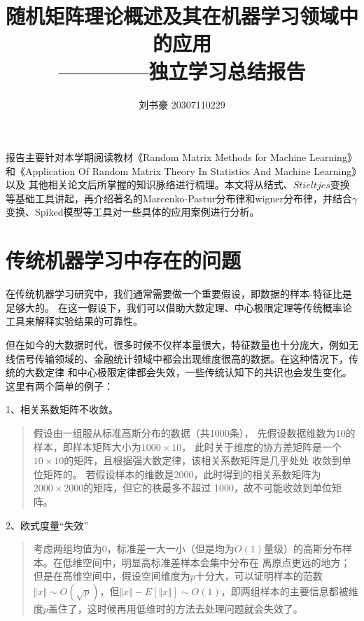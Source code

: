 \documentclass[UTF8,12pt]{ctexart}
\newenvironment{myquote}
{\begin{quote}\kaishu\zihao{5}}
{\end{quote}}
\begin{document}
\title{随机矩阵理论概述及其在机器学习领域中的应用 \\ \large {————独立学习总结报告}}
\author{刘书豪 20307110229}
\date{}
\maketitle

报告主要针对本学期阅读教材《Random Matrix Methods for Machine Learning》\cite{couillet_liao_2022}和《Application Of Random Matrix Theory In Statistics And Machine Learning》\cite{random2}以及
其他相关论文后所掌握的知识脉络进行梳理。本文将从结式、$Stieltjes$变换等基础工具讲起，再介绍著名的Marcenko-Pastur分布律和wigner分布律，并结合$\gamma$变换、Spiked模型等工具对一些具体的应用案例进行分析。

\tableofcontents

\newpage

\section{传统机器学习中存在的问题}

在传统机器学习研究中，我们通常需要做一个重要假设，即数据的样本-特征比是足够大的。
在这一假设下，我们可以借助大数定理、中心极限定理等传统概率论工具来解释实验结果的可靠性。

但在如今的大数据时代，很多时候不仅样本量很大，特征数量也十分庞大，例如无线信号传输领域的\cite{Li2007MIMORW}、金融统计领域\cite{Laloux2000RANDOMMT}中都会出现维度很高的数据。在这种情况下，传统的大数定律
和中心极限定律都会失效，一些传统认知下的共识也会发生变化\cite{vaart_1998}。这里有两个简单的例子：

1、相关系数矩阵不收敛。

\begin{myquote}
    假设由一组服从标准高斯分布的数据（共1000条），
    先假设数据维数为10的样本，即样本矩阵大小为$1000 \times 10 $，
    此时关于维度的协方差矩阵是一个$10\times 10$的矩阵，且根据强大数定律，该相关系数矩阵是几乎处处
    收敛到单位矩阵的。
    若假设样本的维数是2000，此时得到的相关系数矩阵为$2000\times 2000$的矩阵，但它的秩最多不超过
    1000，故不可能收敛到单位矩阵。
\end{myquote}

2、欧式度量“失效”
\begin{myquote}
    考虑两组均值为0，标准差一大一小（但是均为$O(1)$量级）的高斯分布样本。在低维空间中，明显高标准差样本会集中分布在
    离原点更远的地方；但是在高维空间中，假设空间维度为$p$十分大，可以证明样本的范数$\Vert x\Vert\sim O(\sqrt{p})$，但$\Vert x\Vert-E[\Vert x\Vert]
    \sim O(1)$，即两组样本的主要信息都被维度$p$盖住了，这时候再用低维时的方法去处理问题就会失效了。
\end{myquote}
\end{document}
